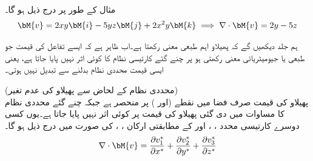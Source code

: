 مثال کے طور پر  درج ذیل ہو گا۔
\begin{align*}
\bM{v}=2xy\bM{i}-5yz\bM{j}+2x^2y\bM{k}\implies \nabla \cdot \bM{v}=2y-5z
\end{align*}

ہم جلد دیکھیں گے کہ پھیلاو اہم طبعی معنی  رکھتا ہے۔اب ظاہر ہے کہ ایسے تفاعل کی قیمت جو طبعی یا جیومیٹریائی معنی رکھتی ہو پر چنے گئے کارتیسی نظام کا کوئی اثر نہیں پایا جاتا ہے، یعنی ایسی قیمت محددی نظام بدلنے سے تبدیل نہیں ہوتی۔ 

\quad (محددی نظام کے لحاض سے پھیلاو کی عدم تغیر) \\
پھیلاو  کی قیمت صرف فضا میں نقطے  (اور ) پر منحصر ہے جبکہ چنے گئے محددی نظام کا مساوات  میں دی گئی پھیلاو کی قیمت پر کوئی اثر نہیں پایا جاتا ہے۔یوں کسی دوسرے کارتیسی محدد ، ،  اور  کے مطابقتی ارکان ، ،  کی صورت میں  درج ذیل ہو گا۔
\begin{align}\label{مساوات_الاحصاء_پھیلاو_تعریف_ب}
\nabla \cdot \bM{v}=\frac{\partial v_1^*}{\partial x^*}+\frac{\partial v_2^*}{\partial y^*}+\frac{\partial v_3^*}{\partial z^*}
\end{align}

